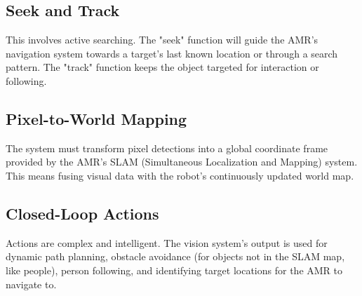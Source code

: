 \subsection{Seek and Track}
This involves active searching. The "seek" function will guide the AMR's navigation system towards a target's last known location or through a search pattern. The "track" function keeps the object targeted for interaction or following.

\subsection{Pixel-to-World Mapping}
The system must transform pixel detections into a global coordinate frame provided by the AMR's SLAM (Simultaneous Localization and Mapping) system. This means fusing visual data with the robot's continuously updated world map.

\subsection{Closed-Loop Actions}
Actions are complex and intelligent. The vision system's output is used for dynamic path planning, obstacle avoidance (for objects not in the SLAM map, like people), person following, and identifying target locations for the AMR to navigate to.